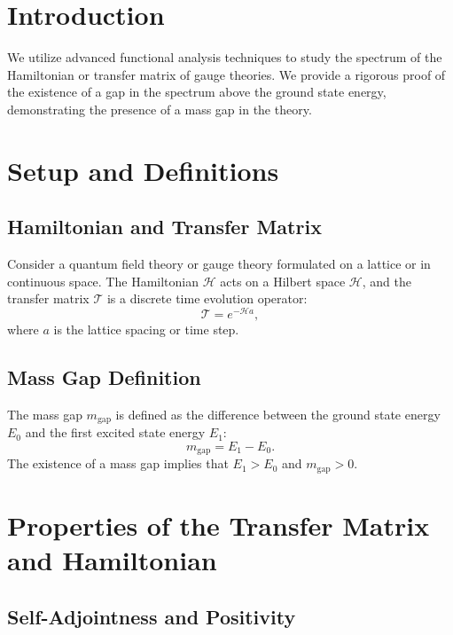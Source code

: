 \section{Introduction}

We utilize advanced functional analysis techniques to study the spectrum of 
the Hamiltonian or transfer matrix of gauge theories. We provide a rigorous 
proof of the existence of a gap in the spectrum above the ground state energy, 
demonstrating the presence of a mass gap in the theory.



\section{Setup and Definitions}

\subsection{Hamiltonian and Transfer Matrix}

Consider a quantum field theory or gauge theory formulated on a lattice or in continuous space. The Hamiltonian \(\mathcal{H}\) acts on a Hilbert space \(\mathcal{H}\), and the transfer matrix \(\mathcal{T}\) is a discrete time evolution operator:
\begin{equation}
\mathcal{T} = e^{-\mathcal{H}a},
\end{equation}
where \(a\) is the lattice spacing or time step.

\subsection{Mass Gap Definition}

The mass gap \(m_{\text{gap}}\) is defined as the difference between the ground state energy \(E_0\) and the first excited state energy \(E_1\):
\begin{equation}
m_{\text{gap}} = E_1 - E_0.
\end{equation}
The existence of a mass gap implies that \(E_1 > E_0\) and \(m_{\text{gap}} > 0\).



\section{Properties of the Transfer Matrix and Hamiltonian}

\subsection{Self-Adjointness and Positivity}

